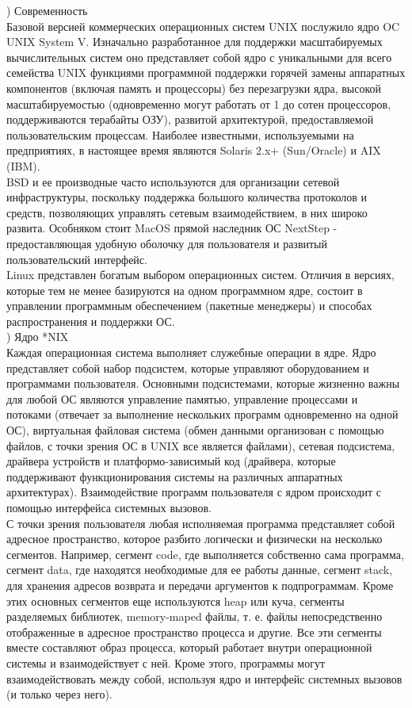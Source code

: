) Современность \\
Базовой версией коммерческих операционных систем UNIX послужило ядро OC UNIX System V. Изначально разработанное для поддержки масштабируемых вычислительных систем оно представляет собой ядро с уникальными для всего семейства UNIX функциями программной поддержки горячей замены аппаратных компонентов (включая память и процессоры) без перезагрузки ядра, высокой масштабируемостью (одновременно могут работать от 1 до сотен процессоров, поддерживаются терабайты ОЗУ), развитой архитектурой, предоставляемой пользовательским процессам. Наиболее известными, используемыми на предприятиях, в настоящее время являются Solaris 2.x+ (Sun/Oracle) и AIX (IBM). \\
BSD и ее производные часто используются для организации сетевой инфраструктуры, поскольку поддержка большого количества протоколов и средств, позволяющих управлять сетевым взаимодействием, в них широко развита. Особняком стоит MacOS прямой наследник ОС NextStep - предоставляющая удобную оболочку для пользователя и развитый пользовательский интерфейс. \\
Linux представлен богатым выбором операционных систем. Отличия в версиях, которые тем не менее базируются на одном программном ядре, состоит в управлении программным обеспечением (пакетные менеджеры) и способах распространения и поддержки ОС. \\

) Ядро *NIX \\
Каждая операционная система выполняет служебные операции в ядре. Ядро представляет собой набор подсистем, которые управляют оборудованием и программами пользователя. Основными подсистемами, которые жизненно важны для любой ОС являются управление памятью, управление процессами и потоками (отвечает за выполнение нескольких программ одновременно на одной ОС), виртуальная файловая система (обмен данными организован с помощью файлов, с точки зрения ОС в UNIX все является файлами), сетевая подсистема, драйвера устройств и платформо-зависимый код (драйвера, которые поддерживают функционирования системы на различных аппаратных архитектурах). Взаимодействие программ пользователя с ядром происходит с помощью интерфейса
системных вызовов. \\
С точки зрения пользователя любая исполняемая программа представляет собой адресное пространство, которое разбито логически и физически на несколько сегментов. Например, сегмент code, где выполняется собственно сама программа, сегмент data, где находятся необходимые для ее работы данные, сегмент stack, для хранения адресов возврата и передачи аргументов к подпрограммам. Кроме этих основных сегментов еще используются heap или куча, сегменты разделяемых библиотек, memory-maped файлы, т. е. файлы непосредственно отображенные в адресное пространство процесса и другие. Все эти сегменты вместе составляют образ процесса, который работает внутри операционной системы и взаимодействует с ней.
Кроме этого, программы могут взаимодействовать между собой, используя ядро и интерфейс системных вызовов (и только через него). \\

